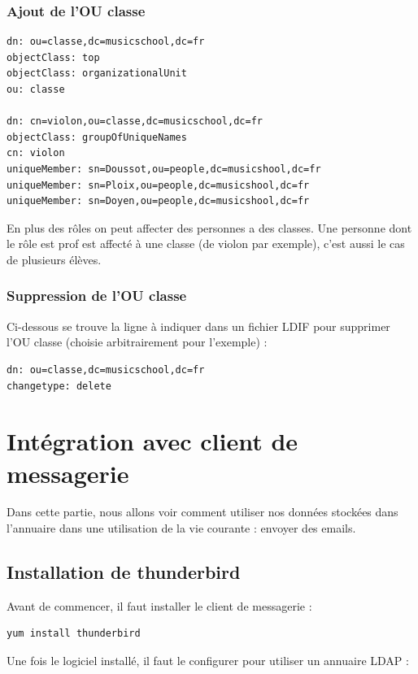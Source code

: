\documentclass[12pt,a4paper,notitlepage]{article}
\begin{document}
\subsubsection{Ajout de l'OU classe}

\begin{lstlisting}[title=classe.ldif]
dn: ou=classe,dc=musicschool,dc=fr
objectClass: top
objectClass: organizationalUnit
ou: classe

dn: cn=violon,ou=classe,dc=musicschool,dc=fr
objectClass: groupOfUniqueNames
cn: violon
uniqueMember: sn=Doussot,ou=people,dc=musicshool,dc=fr
uniqueMember: sn=Ploix,ou=people,dc=musicshool,dc=fr
uniqueMember: sn=Doyen,ou=people,dc=musicshool,dc=fr
\end{lstlisting}
En plus des rôles on peut affecter des personnes a des classes. Une personne dont le rôle est prof est affecté à une classe (de violon par exemple), c'est aussi le cas de plusieurs élèves.
\subsubsection{Suppression de l'OU classe}
Ci-dessous se trouve la ligne à indiquer dans un fichier LDIF pour supprimer l'OU classe (choisie arbitrairement pour l'exemple) : 
\begin{lstlisting}[title=delete-classe.ldif]
dn: ou=classe,dc=musicschool,dc=fr
changetype: delete
\end{lstlisting}


\clearpage
\section{Intégration avec client de messagerie}

Dans cette partie, nous allons voir comment utiliser nos données stockées dans l'annuaire dans une utilisation de la vie courante : envoyer des emails.
\subsection{Installation de thunderbird}

Avant de commencer, il faut installer le client de messagerie :
\begin{verbatim}
yum install thunderbird
\end{verbatim}

\bigskip

Une fois le logiciel installé, il faut le configurer pour utiliser un annuaire LDAP :
\end{document}
